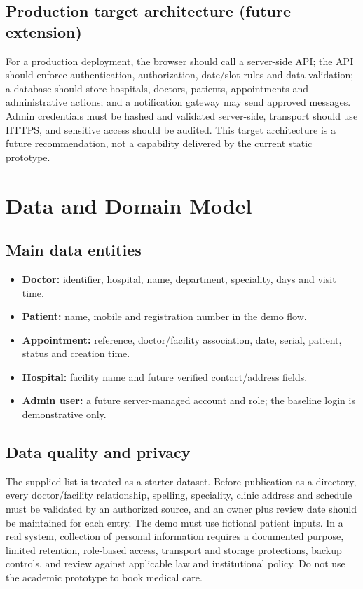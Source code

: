 \documentclass[11pt,a4paper]{article}
\begin{document}
\subsection{Production target architecture (future extension)}
For a production deployment, the browser should call a server-side API; the API should enforce authentication, authorization, date/slot rules and data validation; a database should store hospitals, doctors, patients, appointments and administrative actions; and a notification gateway may send approved messages. Admin credentials must be hashed and validated server-side, transport should use HTTPS, and sensitive access should be audited. This target architecture is a future recommendation, not a capability delivered by the current static prototype.

\section{Data and Domain Model}
\subsection{Main data entities}
\begin{itemize}
  \item \textbf{Doctor:} identifier, hospital, name, department, speciality, days and visit time.
  \item \textbf{Patient:} name, mobile and registration number in the demo flow.
  \item \textbf{Appointment:} reference, doctor/facility association, date, serial, patient, status and creation time.
  \item \textbf{Hospital:} facility name and future verified contact/address fields.
  \item \textbf{Admin user:} a future server-managed account and role; the baseline login is demonstrative only.
\end{itemize}

\subsection{Data quality and privacy}
The supplied list is treated as a starter dataset. Before publication as a directory, every doctor/facility relationship, spelling, speciality, clinic address and schedule must be validated by an authorized source, and an owner plus review date should be maintained for each entry. The demo must use fictional patient inputs. In a real system, collection of personal information requires a documented purpose, limited retention, role-based access, transport and storage protections, backup controls, and review against applicable law and institutional policy. Do not use the academic prototype to book medical care.
\end{document}
